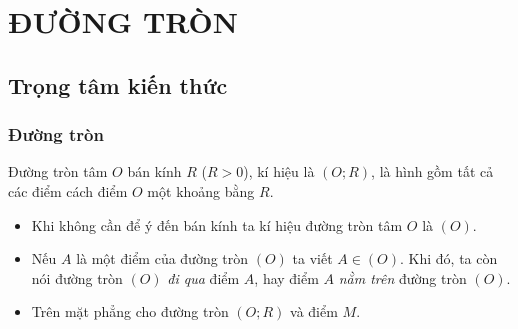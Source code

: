 \setcounter{section}{0}
\section{ĐƯỜNG TRÒN}
\subsection{Trọng tâm kiến thức}
\begin{tomtat}
\subsubsection{Đường tròn}
\begin{boxdn}
 Đường tròn tâm $O$ bán kính $R$ ($R>0$), kí hiệu là $(O;R)$, là hình gồm tất cả các điểm cách điểm $O$ một khoảng bằng $R$.
\end{boxdn}
\begin{note}
 \begin{itemize}
 \item Khi không cần để ý đến bán kính ta kí hiệu đường tròn tâm $O$ là $(O)$.
 \item Nếu $A$ là một điểm của đường tròn $(O)$ ta viết $A \in (O)$. Khi đó, ta còn nói đường tròn $(O)$ \textit{đi qua} điểm $A$, hay điểm $A$ \textit{nằm trên} đường tròn $(O)$.
 \end{itemize}
\end{note}
\begin{nx}
 \begin{itemize}
 \item Trên mặt phẳng cho đường tròn $(O;R)$ và điểm $M$. 
\end{itemize}
\end{nx}
\end{tomtat}
